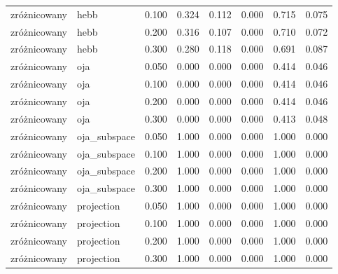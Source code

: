 \begin{tabular}{llrrrrrr}
zróżnicowany & hebb & 0.100 & 0.324 & 0.112 & 0.000 & 0.715 & 0.075 \\

zróżnicowany & hebb & 0.200 & 0.316 & 0.107 & 0.000 & 0.710 & 0.072 \\

zróżnicowany & hebb & 0.300 & 0.280 & 0.118 & 0.000 & 0.691 & 0.087 \\

zróżnicowany & oja & 0.050 & 0.000 & 0.000 & 0.000 & 0.414 & 0.046 \\

zróżnicowany & oja & 0.100 & 0.000 & 0.000 & 0.000 & 0.414 & 0.046 \\

zróżnicowany & oja & 0.200 & 0.000 & 0.000 & 0.000 & 0.414 & 0.046 \\

zróżnicowany & oja & 0.300 & 0.000 & 0.000 & 0.000 & 0.413 & 0.048 \\

zróżnicowany & oja\_subspace & 0.050 & 1.000 & 0.000 & 0.000 & 1.000 & 0.000 \\

zróżnicowany & oja\_subspace & 0.100 & 1.000 & 0.000 & 0.000 & 1.000 & 0.000 \\

zróżnicowany & oja\_subspace & 0.200 & 1.000 & 0.000 & 0.000 & 1.000 & 0.000 \\

zróżnicowany & oja\_subspace & 0.300 & 1.000 & 0.000 & 0.000 & 1.000 & 0.000 \\

zróżnicowany & projection & 0.050 & 1.000 & 0.000 & 0.000 & 1.000 & 0.000 \\

zróżnicowany & projection & 0.100 & 1.000 & 0.000 & 0.000 & 1.000 & 0.000 \\

zróżnicowany & projection & 0.200 & 1.000 & 0.000 & 0.000 & 1.000 & 0.000 \\

zróżnicowany & projection & 0.300 & 1.000 & 0.000 & 0.000 & 1.000 & 0.000 \\

\bottomrule

\end{tabular}

